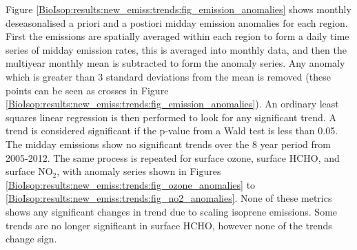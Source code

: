       Figure \ref{BioIsop:results:new_emiss:trends:fig_emission_anomalies} shows monthly deseasonalised a priori and a postiori midday emission anomalies for each region.
      First the emissions are spatially averaged within each region to form a daily time series of midday emission rates, this is averaged into monthly data, and then the multiyear monthly mean is subtracted to form the anomaly series.
      Any anomaly which is greater than 3 standard deviations from the mean is removed (these points can be seen as crosses in Figure \ref{BioIsop:results:new_emiss:trends:fig_emission_anomalies}).
      An ordinary least squares linear regression is then performed to look for any significant trend.
      A trend is considered significant if the p-value from a Wald test is less than 0.05.
      The midday emissions show no significant trends over the 8 year period from 2005-2012.
      The same process is repeated for surface ozone, surface HCHO, and surface NO$_2$, with anomaly series shown in Figures \ref{BioIsop:results:new_emiss:trends:fig_ozone_anomalies} to \ref{BioIsop:results:new_emiss:trends:fig_no2_anomalies}.
      None of these metrics shows any significant changes in trend due to scaling isoprene emissions.
      Some trends are no longer significant in surface HCHO, however none of the trends change sign.
      
      
      
      
      
      
